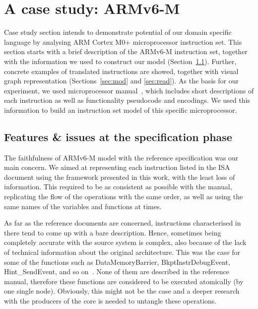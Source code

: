 \documentclass[conference]{IEEEtran}
\begin{document}

\section{A case study: ARMv6-M}
\label{sec:arm}
Case study section intends to demonstrate potential of our domain specific language by
analysing ARM Cortex M0+ microprocessor instruction set. This section starts with a brief
description of the ARMv6-M instruction set, together with the information we used to construct our model
(Section~\ref{sec:feat}). Further, concrete examples of translated instructions are
showed, together with visual graph representation (Sections~\ref{sec:mod} and
\ref{sec:read}). As the basis for our experiment, we used microprocessor
manual~\cite{armManual}, which includes short descriptions of each instruction as well as
functionality pseudocode and encodings. We used this information to build an instruction set
model of this specific microprocessor. 

\subsection{Features \& issues at the specification phase}
\label{sec:feat}
The faithfulness of ARMv6-M model with the reference specification was our main concern.
We aimed at representing each instruction listed in the ISA document using the
framework presented in this work, with the least loss of information. This required to be
as consistent as possible with the manual, replicating the flow of the operations with
the same order, as well as using the same names of the variables and functions at times.

As far as the reference documents are concerned, instructions characterised in there tend to
come up with a bare description. Hence, sometimes being completely accurate with 
the source system is complex, also because of the lack of technical information about the
original architecture. This was the case for some of the functions such as DataMemoryBarrier,
BkptInstrDebugEvent, Hint\_SendEvent, and so on~\cite{armManual}.
None of them are described in the reference manual, therefore these
functions are considered to be executed atomically (by one single node). Obviously, this
might not be the case and a deeper research with the producers of the core is needed to
untangle these operations.
\end{document}
